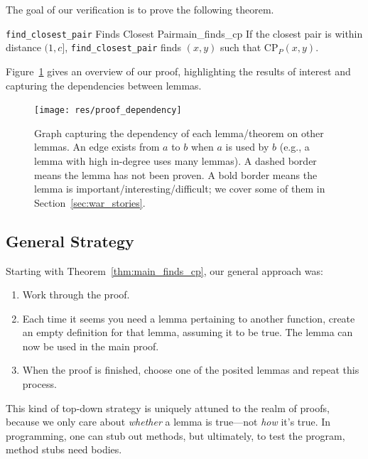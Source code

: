 \documentclass{article}
\begin{document}
The goal of our verification is to prove the following theorem.
\begin{tcbtheorem}{{\large\texttt{find\_closest\_pair}} Finds Closest Pair}{main_finds_cp}
If the closest pair is within distance $(1, c]$, \texttt{find\_closest\_pair} finds $(x, y)$ such that $\text{CP}_P(x, y)$.
\end{tcbtheorem}
Figure~\ref{fig:proof_dependency} gives an overview of our proof, highlighting the results of interest and capturing the dependencies between lemmas.

\begin{figure}[H]
  \begin{center}
  \texttt{[image: res/proof\_dependency]}
  \end{center}
  \caption{
    Graph capturing the dependency of each lemma/theorem on other lemmas.
    An edge exists from $a$ to $b$ when $a$ is used by $b$ (e.g., a lemma with high in-degree uses many lemmas).
    A dashed border means the lemma has not been proven.
    A bold border means the lemma is important/interesting/difficult; we cover some of them in Section~\ref{sec:war_stories}.
  }\label{fig:proof_dependency}
\end{figure}

\subsection{General Strategy}
Starting with Theorem~\ref{thm:main_finds_cp}, our general approach was:
\begin{enumerate}
  \item Work through the proof.
  \item Each time it seems you need a lemma pertaining to another function, create an empty definition for that lemma, assuming it to be true.
  The lemma can now be used in the main proof.
  \item When the proof is finished, choose one of the posited lemmas and repeat this process.
\end{enumerate}
This kind of top-down strategy is uniquely attuned to the realm of proofs, because we only care about \textit{whether} a lemma is true---not \textit{how} it's true.
In programming, one can stub out methods, but ultimately, to test the program, method stubs need bodies.

\end{document}
